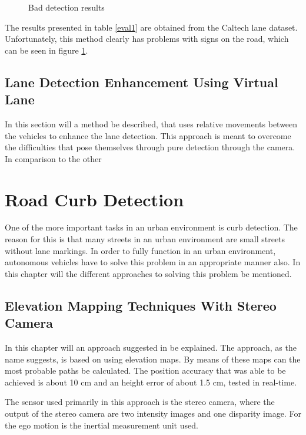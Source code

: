 \documentclass[conference]{IEEEtran}
\begin{document}
\begin{figure}[ht]
	\centering
	\caption{Bad detection results}
	\label{fig6}
\end{figure}

The results presented in table \ref{eval1} are obtained from the Caltech lane dataset. Unfortunately, this method clearly has problems with signs on the road, which can be seen in figure \ref{fig6}.


\subsection{Lane Detection Enhancement Using Virtual Lane}

In this section will a method be described, that uses relative movements between the vehicles to enhance the lane detection. This approach is meant to overcome the difficulties that pose themselves through pure detection through the camera. In comparison to the other  



\section{Road Curb Detection}

One of the more important tasks in an urban environment is curb detection. The reason for this is that many streets in an urban environment are small streets without lane markings. In order to fully function in an urban environment, autonomous vehicles have to solve this problem in an appropriate manner also. In this chapter will the different approaches to solving this problem be mentioned.  

\subsection{Elevation Mapping Techniques With Stereo Camera}

In this chapter will an approach suggested in \cite{stereo} be explained. The approach, as the name suggests, is based on using elevation maps. By means of these maps can the most probable paths be calculated. The position accuracy that was able to be achieved is about 10 cm and an height error of about 1.5 cm, tested in real-time.

The sensor used primarily in this approach is the stereo camera, where the output of the stereo camera are two intensity images and one disparity image. For the ego motion is the inertial measurement unit used. 
\end{document}
